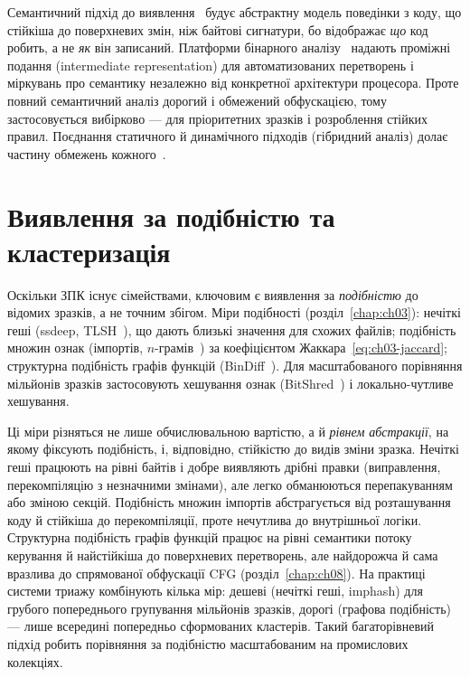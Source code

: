 Семантичний підхід до виявлення~\cite{ch06:christodorescu} будує абстрактну модель поведінки з коду, що стійкіша до поверхневих змін, ніж байтові сигнатури, бо відображає \emph{що} код робить, а не \emph{як} він записаний. Платформи бінарного аналізу~\cite{ch06:brumley} надають проміжні подання (intermediate representation) для автоматизованих перетворень і міркувань про семантику незалежно від конкретної архітектури процесора. Проте повний семантичний аналіз дорогий і обмежений обфускацією, тому застосовується вибірково --- для пріоритетних зразків і розроблення стійких правил. Поєднання статичного й динамічного підходів (гібридний аналіз) долає частину обмежень кожного~\cite{ch03:hybrid}.

\section{Виявлення за подібністю та кластеризація}\label{sec:ch06-similarity}

Оскільки ЗПК існує сімействами, ключовим є виявлення за \emph{подібністю} до відомих зразків, а не точним збігом. Міри подібності (розділ~\ref{chap:ch03}): нечіткі геші (ssdeep, TLSH~\cite{ch06:tlsh}), що дають близькі значення для схожих файлів; подібність множин ознак (імпортів, $n$-грамів~\cite{ch03:kolter}) за коефіцієнтом Жаккара~\eqref{eq:ch03-jaccard}; структурна подібність графів функцій (BinDiff~\cite{ch06:bindiff}). Для масштабованого порівняння мільйонів зразків застосовують хешування ознак (BitShred~\cite{ch06:jang}) і локально-чутливе хешування.

Ці міри різняться не лише обчислювальною вартістю, а й \emph{рівнем абстракції}, на якому фіксують подібність, і, відповідно, стійкістю до видів зміни зразка. Нечіткі геші працюють на рівні байтів і добре виявляють дрібні правки (виправлення, перекомпіляцію з незначними змінами), але легко обманюються перепакуванням або зміною секцій. Подібність множин імпортів абстрагується від розташування коду й стійкіша до перекомпіляції, проте нечутлива до внутрішньої логіки. Структурна подібність графів функцій працює на рівні семантики потоку керування й найстійкіша до поверхневих перетворень, але найдорожча й сама вразлива до спрямованої обфускації CFG (розділ~\ref{chap:ch08}). На практиці системи триажу комбінують кілька мір: дешеві (нечіткі геші, imphash) для грубого попереднього групування мільйонів зразків, дорогі (графова подібність) --- лише всередині попередньо сформованих кластерів. Такий багаторівневий підхід робить порівняння за подібністю масштабованим на промислових колекціях.

